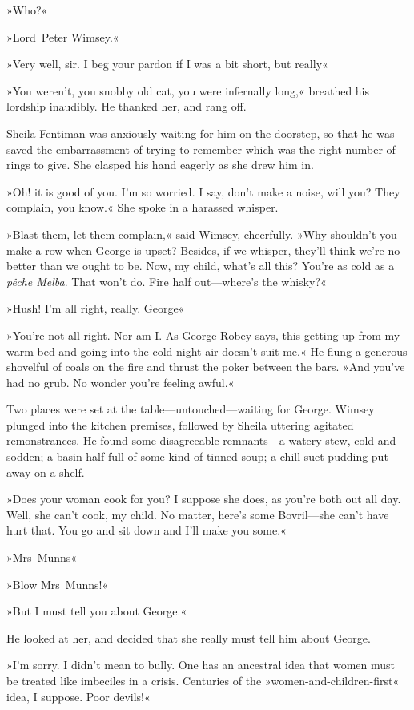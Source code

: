 »Who?«

»Lord~Peter Wimsey.«

»Very well, sir. I beg your pardon if I was a bit short, but really\longdash«

»You weren't, you snobby old cat, you were infernally long,« breathed his lordship inaudibly. He thanked her, and rang off.

Sheila Fentiman was anxiously waiting for him on the doorstep, so that he was saved the embarrassment of trying to remember which was the right number of rings to give. She clasped his hand eagerly as she drew him in.

»Oh! it is good of you. I'm so worried. I say, don't make a noise, will you? They complain, you know.« She spoke in a harassed whisper.

»Blast them, let them complain,« said Wimsey, cheerfully. »Why shouldn't you make a row when George is upset? Besides, if we whisper, they'll think we're no better than we ought to be. Now, my child, what's all this? You're as cold as a \textit{pêche Melba}. That won't do. Fire half out—where's the whisky?«

»Hush! I'm all right, really. George\longdash«

»You're not all right. Nor am I. As George Robey says, this getting up from my warm bed and going into the cold night air doesn't suit me.« He flung a generous shovelful of coals on the fire and thrust the poker between the bars. »And you've had no grub. No wonder you're feeling awful.«

Two places were set at the table—untouched—waiting for George. Wimsey plunged into the kitchen premises, followed by Sheila uttering agitated remonstrances. He found some disagreeable remnants—a watery stew, cold and sodden; a basin half-full of some kind of tinned soup; a chill suet pudding put away on a shelf.

»Does your woman cook for you? I suppose she does, as you're both out all day. Well, she can't cook, my child. No matter, here's some Bovril—she can't have hurt that. You go and sit down and I'll make you some.«

»Mrs~Munns\longdash«

»Blow Mrs~Munns!«

»But I must tell you about George.«

He looked at her, and decided that she really must tell him about George.

»I'm sorry. I didn't mean to bully. One has an ancestral idea that women must be treated like imbeciles in a crisis. Centuries of the »women-and-children-first« idea, I suppose. Poor devils!«


